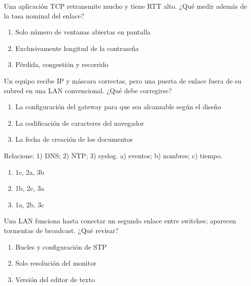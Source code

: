 \noindent\begin{minipage}{\linewidth}\setlength{\parskip}{4pt}\label{q:R-048}
Una aplicación TCP retransmite mucho y tiene RTT alto. ¿Qué medir además de la tasa nominal del enlace?
\begin{enumerate}[label=\Alph*),nosep]
\item Solo número de ventanas abiertas en pantalla
\item Exclusivamente longitud de la contraseña
\item Pérdida, congestión y recorrido
\end{enumerate}\end{minipage}\par\medskip

\noindent\begin{minipage}{\linewidth}\setlength{\parskip}{4pt}\label{q:R-049}
Un equipo recibe IP y máscara correctas, pero una puerta de enlace fuera de su subred en una LAN convencional. ¿Qué debe corregirse?
\begin{enumerate}[label=\Alph*),nosep]
\item La configuración del gateway para que sea alcanzable según el diseño
\item La codificación de caracteres del navegador
\item La fecha de creación de los documentos
\end{enumerate}\end{minipage}\par\medskip

\noindent\begin{minipage}{\linewidth}\setlength{\parskip}{4pt}\label{q:R-050}
Relacione: 1) DNS; 2) NTP; 3) syslog. a) eventos; b) nombres; c) tiempo.
\begin{enumerate}[label=\Alph*),nosep]
\item 1c, 2a, 3b
\item 1b, 2c, 3a
\item 1a, 2b, 3c
\end{enumerate}\end{minipage}\par\medskip

\noindent\begin{minipage}{\linewidth}\setlength{\parskip}{4pt}\label{q:R-051}
Una LAN funciona hasta conectar un segundo enlace entre switches; aparecen tormentas de broadcast. ¿Qué revisar?
\begin{enumerate}[label=\Alph*),nosep]
\item Bucles y configuración de STP
\item Solo resolución del monitor
\item Versión del editor de texto
\end{enumerate}\end{minipage}\par\medskip

